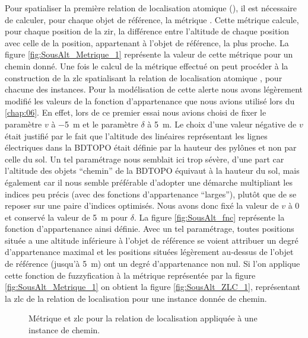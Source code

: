 Pour spatialiser la première relation de localisation atomique
(), il est nécessaire de calculer, pour
chaque objet de référence, la métrique
. Cette métrique calcule, pour chaque
position de la \ac{zir}, la différence entre l'altitude de chaque
position avec celle de la position, appartenant à l'objet de
référence, la plus proche. La figure \ref{fig:SousAlt_Metrique_1}
représente la valeur de cette métrique pour un chemin donné. Une fois
le calcul de la métrique effectué on peut procéder à la construction
de la \ac{zlc} spatialisant la relation de localisation atomique
, pour chacune des instances. Pour la
modélisation de cette alerte nous avons légèrement modifié les valeurs
de la fonction d'appartenance que nous avions utilisé lors du
\autoref{chap:06}. En effet, lors de ce premier essai nous avions
choisi de fixer le paramètre \(v\) à \SI{-5}{\meter} et le paramètre
\(\delta\) à \SI{5}{\meter}. Le choix d'une valeur négative de \(v\)
était justifié par le fait que l'altitude des linéaires représentant
les lignes électriques dans la BDTOPO était définie par la hauteur des
pylônes et non par celle du sol. Un tel paramétrage nous semblait ici
trop sévère, d'une part car l'altitude des objets \enquote{chemin} de
la BDTOPO équivaut à la hauteur du sol, mais également car il nous
semble préférable d'adopter une démarche multipliant les indices peu
précis (\ie avec des fonctions d'appartenance \enquote{larges}),
plutôt que de se reposer sur une paire d'indices optimisés. Nous avons
donc fixé la valeur de \(v\) à 0 et conservé la valeur de
\SI{5}{\meter} pour \(\delta\). La figure \ref{fig:SousAlt_fnc}
représente la fonction d'appartenance ainsi définie. Avec un tel
paramétrage, toutes positions située a une altitude inférieure à
l'objet de référence se voient attribuer un degré d'appartenance
maximal et les positions situées légèrement au-dessus de l'objet de
référence (jusqu'à \SI{5}{\meter}) ont un degré d'appartenance non
nul. Si l'on applique cette fonction de fuzzyfication à la métrique
représentée par la figure \ref{fig:SousAlt_Metrique_1} on obtient la
figure \ref{fig:SousAlt_ZLC_1}, représentant la \ac{zlc} de la
relation de localisation  pour une instance
donnée de chemin.

\begin{figure}
  \centering
  
  \caption{Métrique \protect{} et
    \ac{zlc} \protect{} pour la relation de
    localisation \protect{} appliquée à une
    instance de chemin.}
  \label{fig:SousAlt_1}
\end{figure}

